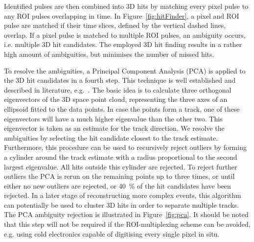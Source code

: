 \documentclass[instruments,article,submit,moreauthors,pdftex]{Definitions/mdpi}
\begin{document}
Identified pulses are then combined into 3D hits by matching every pixel pulse to any ROI pulses overlapping in time.
In Figure~\ref{fig:hitFinder}, a pixel and ROI pulse are matched if their time slices, defined by the vertical dashed lines, overlap.
If a pixel pulse is matched to multiple ROI pulses, an ambiguity occurs, i.e. multiple 3D hit candidates.
The employed 3D hit finding results in a rather high amount of ambiguities, but minimises the number of missed hits.

To resolve the ambiguities, a Principal Component Analysis (PCA) is applied to the 3D hit candidates in a fourth step.
This technique is well established and described in literature, e.g.~\cite{pca}.
The basic idea is to calculate three orthogonal eigenvectors of the 3D space point cloud, representing the three axes of an ellipsoid fitted to the data points.
In case the points form a track, one of these eigenvectors will have a much higher eigenvalue than the other two.
This eigenvector is taken as an estimate for the track direction.
We resolve the ambiguities by selecting the hit candidate closest to the track estimate.
Furthermore, this procedure can be used to recursively reject outliers by forming a cylinder around the track estimate with a radius proportional to the second largest eigenvalue.
All hits outside this cylinder are rejected.
To reject further outliers the PCA is rerun on the remaining points up to three times, or until either no new outliers are rejected, or \SI{40}{\percent} of the hit candidates have been rejected.
In a later stage of reconstructing more complex events, this algorithm can potentially be used to cluster 3D hits in order to separate multiple tracks.
The PCA ambiguity rejection is illustrated in Figure~\ref{fig:pca}.
It should be noted that this step will not be required if the ROI-multiplexing scheme can be avoided, e.g. using cold electronics capable of digitising every single pixel in situ. 
\end{document}
